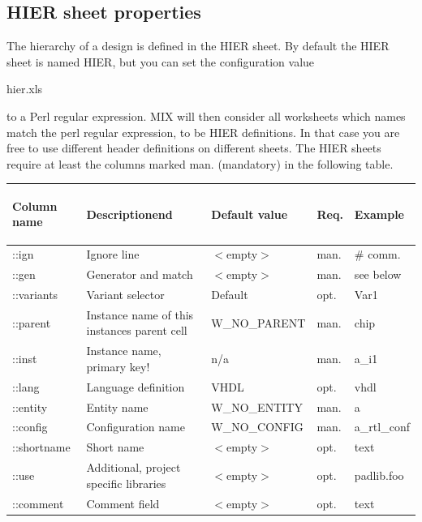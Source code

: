 \documentclass[a4paper,12pt]{article}
\begin{document}
\subsection{HIER sheet properties}
The hierarchy of a design is defined in the HIER sheet. By default the HIER sheet is named HIER, but you can set the configuration value \begin{bf}hier.xls\end{bf} to a Perl regular expression. MIX will then consider all worksheets which names match the perl regular expression, to be HIER definitions. In that case you are free to use different header definitions on different sheets.\newline
The HIER sheets require at least the columns marked man. (mandatory) in the following table.

\begin{table}[htb]\begin{tabular}{|l|p{4cm}|p{4cm}|p{15mm}|p{2cm}|}\hline
\begin{bf}Column name\end{bf} & \begin{bf}Descriptionend\end{bf} & \begin{bf}Default value\end{bf} & \begin{bf}Req.\end{bf} & \begin{bf}Example\end{bf}\\\hline
::ign & Ignore line & $<$empty$>$ & man. & \# comm. \\\hline
::gen &  Generator and match & $<$empty$>$ & man. & see below \\\hline
::variants & Variant selector & Default & opt. & Var1\\\hline
::parent & Instance name of this instances parent cell & W\_NO\_PARENT & man. & chip \\\hline
::inst & Instance name, primary key! & n/a & man. & a\_i1\\\hline
::lang & Language definition & VHDL & opt. & vhdl \\\hline
::entity & Entity name & W\_NO\_ENTITY & man. & a \\\hline
::config & Configuration name & W\_NO\_CONFIG & man. & a\_rtl\_conf \\\hline
::shortname & Short name & $<$empty$>$ & opt. & text \\\hline
::use & Additional, project specific libraries & $<$empty$>$ & opt. & padlib.foo \\\hline
::comment & Comment field & $<$empty$>$ & opt. & text \\\hline
\end{tabular}\end{table}
\end{document}
